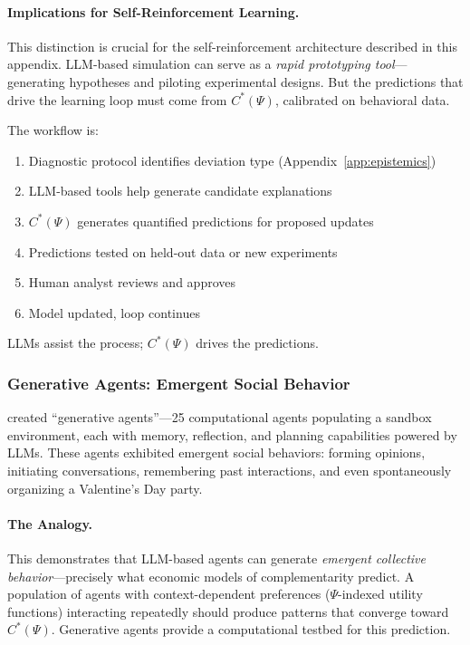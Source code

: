 \paragraph{Implications for Self-Reinforcement Learning.}
This distinction is crucial for the self-reinforcement architecture described 
in this appendix. LLM-based simulation can serve as a \emph{rapid prototyping 
tool}---generating hypotheses and piloting experimental designs. But the 
predictions that drive the learning loop must come from $C^*(\Psi)$, calibrated 
on behavioral data.

The workflow is:
\begin{enumerate}
    \item Diagnostic protocol identifies deviation type (Appendix~\ref{app:epistemics})
    \item LLM-based tools help generate candidate explanations
    \item $C^*(\Psi)$ generates quantified predictions for proposed updates
    \item Predictions tested on held-out data or new experiments
    \item Human analyst reviews and approves
    \item Model updated, loop continues
\end{enumerate}

LLMs assist the process; $C^*(\Psi)$ drives the predictions.

\subsubsection{Generative Agents: Emergent Social Behavior}

\citet{park2023} created ``generative agents''---25 computational agents 
populating a sandbox environment, each with memory, reflection, and planning 
capabilities powered by LLMs. These agents exhibited emergent social behaviors: 
forming opinions, initiating conversations, remembering past interactions, and 
even spontaneously organizing a Valentine's Day party.

\paragraph{The Analogy.}
This demonstrates that LLM-based agents can generate \emph{emergent collective 
behavior}---precisely what economic models of complementarity predict. A 
population of agents with context-dependent preferences ($\Psi$-indexed utility 
functions) interacting repeatedly should produce patterns that converge toward 
$C^*(\Psi)$. Generative agents provide a computational testbed for this 
prediction.

